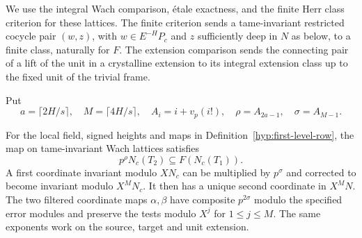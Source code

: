 We use the integral Wach comparison,
étale exactness, and the finite Herr class criterion for these
lattices. The finite criterion sends a tame-invariant restricted
cocycle pair \((w,z)\), with \(w\in E^{-H}P_c\) and \(z\) sufficiently
deep in \(N\) as below, to a finite class, naturally for \(F\).
The extension comparison sends the connecting pair of a lift of the
unit in a crystalline extension to its integral extension class
up to the fixed unit of the trivial frame.
\label{cor:row-metric-2}

Put
\[
 a=\lceil 2H/s\rceil,\quad M=\lceil4H/s\rceil,\quad
 A_i=i+v_p(i!),\quad \rho=A_{2a-1},\quad \sigma=A_{M-1}.
\]
\begin{proposition}
\label{prop:one-level-integral-row-maps}
For the local field, signed heights and maps in Definition~\ref{hyp:first-level-row},
the map on tame-invariant Wach lattices satisfies
\[
 p^\rho N_c(T_2)\subseteq F(N_c(T_1)).
\]
A first coordinate invariant modulo \(XN_c\) can be multiplied
by \(p^\sigma\) and corrected to become invariant modulo
\(X^MN_c\). It then has a
unique second coordinate in \(X^MN\). The two filtered coordinate
maps \(\alpha,\beta\) have composite \(p^{2\sigma}\) modulo the
specified error modules and preserve the tests modulo \(X^j\)
for \(1\le j\le M\). The same exponents work on the source,
target and unit extension.
\end{proposition}

